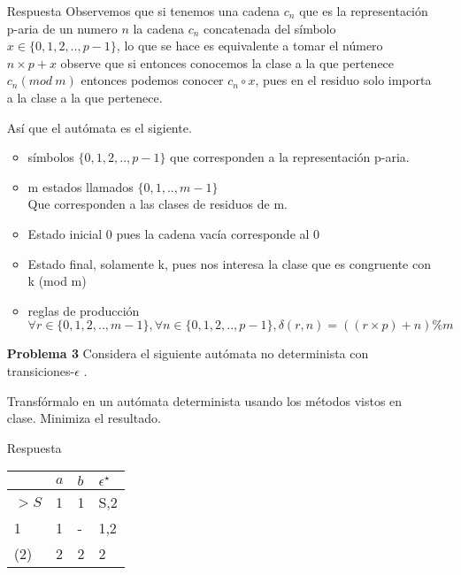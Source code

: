 \documentclass{article}
\begin{document}
\begin{enumerate}
\item[Respuesta]
 Observemos que si tenemos una cadena $c_n$ que es la representación p-aria de un numero $n$ la cadena $c_n$ concatenada del símbolo $x \in \{0,1,2,..,p-1\}$, lo que se hace es equivalente a tomar el número $n \times p + x$ observe que si entonces conocemos la clase a la que pertenece $c_n (mod\ m)$ entonces podemos conocer $c_n \circ x$, pues en el residuo solo importa a la clase a la que pertenece.

Así que el autómata es el sigiente.
\begin{itemize}
\item símbolos $\{0,1,2,..,p-1\}$ que corresponden a la representación p-aria.
\item m estados llamados $\{0,1,..,m-1\}$\\
  Que corresponden a las clases de residuos de m.
\item Estado inicial 0 pues la cadena vacía corresponde al 0
\item Estado final, solamente k, pues nos interesa la clase que es congruente con k (mod m)
\item reglas de producción $\forall r \in \{0,1,2,..,m-1\},\forall n \in \{0,1,2,..,p-1\},  \delta(r,n) = ((r\times p)+n) \% m$ 
\end{itemize}

\item[\bf{Problema 3}] Considera el siguiente autómata no determinista con transiciones-$\epsilon$ .

Transfórmalo en un autómata determinista usando los métodos vistos en clase. Minimiza el
resultado.\\


\item[Respuesta]

\begin{tabular}{ | l || l | l | l  |}
  \hline
    &  $a$    &   $b$  & $\epsilon^\star$ \\
  \hline
$>S$  &  1    &   1  &  S,2 \\    
1   &  1    &   -  &  1,2 \\
(2) &  2    &   2  &  2 \\
  \hline  
\end{tabular}





\end{enumerate}
\end{document}

